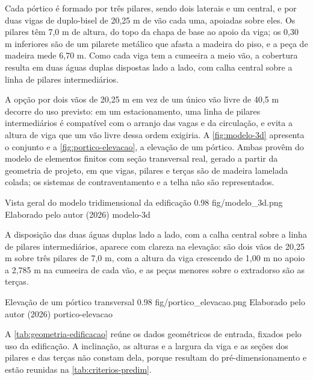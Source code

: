 Cada pórtico é formado por três pilares, sendo dois laterais e um central, e
por duas vigas de duplo-bisel de 20,25 m de vão cada uma, apoiadas sobre eles.
Os pilares têm 7,0 m de altura, do topo da chapa de base ao apoio da viga; os 0,30 m inferiores são de um pilarete metálico que afasta a madeira do piso, e a peça de madeira mede 6,70 m. Como cada viga tem a cumeeira a meio vão, a
cobertura resulta em duas águas duplas dispostas lado a lado, com calha central
sobre a linha de pilares intermediários.

A opção por dois vãos de 20,25 m em vez de um único vão livre de 40,5 m decorre
do uso previsto: em um estacionamento, uma linha de pilares intermediários é
compatível com o arranjo das vagas e da circulação, e evita a altura de viga
que um vão livre dessa ordem exigiria. A \autoref{fig:modelo-3d} apresenta o
conjunto e a \autoref{fig:portico-elevacao}, a elevação de um pórtico. Ambas
provêm do modelo de elementos finitos com seção transversal real, gerado a
partir da geometria de projeto, em que vigas, pilares e terças são de madeira
lamelada colada; os sistemas de contraventamento e a telha não são
representados.

\figura
{Vista geral do modelo tridimensional da edificação}
{0.98}
{fig/modelo_3d.png}
{Elaborado pelo autor (2026)}
{modelo-3d}
{}
{}

A disposição das duas águas duplas lado a lado, com a calha central sobre a
linha de pilares intermediários, aparece com clareza na elevação: são dois vãos
de 20,25 m sobre três pilares de 7,0 m, com a altura da viga crescendo de
1,00 m no apoio a 2,785 m na cumeeira de cada vão, e as peças menores sobre o
extradorso são as terças.

\figura
{Elevação de um pórtico transversal}
{0.98}
{fig/portico_elevacao.png}
{Elaborado pelo autor (2026)}
{portico-elevacao}
{}
{}

A \autoref{tab:geometria-edificacao} reúne os dados geométricos de entrada,
fixados pelo uso da edificação. A inclinação, as alturas e a largura da viga e
as seções dos pilares e das terças não constam dela, porque resultam do
pré-dimensionamento e estão reunidas na \autoref{tab:criterios-predim}.

